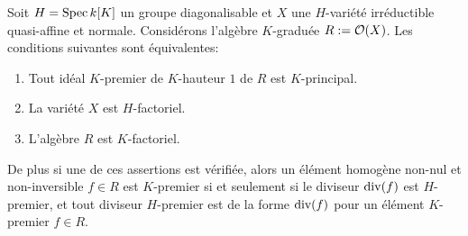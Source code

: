 \begin{prop}
Soit $H=\operatorname{Spec} k[K]$ un groupe diagonalisable et $X$ une $H$-variété irréductible quasi-affine et normale. Considérons l'algèbre $K$-graduée $R:=\mathcal{O}(X)$. Les conditions suivantes sont équivalentes: 
\begin{enumerate}
\item Tout idéal $K$-premier de $K$-hauteur $1$ de $R$ est $K$-principal.
\item La variété $X$ est $H$-factoriel.
\item L'algèbre $R$ est $K$-factoriel.
\end{enumerate}
De plus si une de ces assertions est vérifiée, alors un élément homogène non-nul et non-inversible $f\in R$ est $K$-premier si et seulement si le diviseur $\operatorname{div}(f)$ est $H$-premier, et tout diviseur $H$-premier est de la forme $\operatorname{div}(f)$ pour un élément $K$-premier $f\in R$.
\end{prop}
